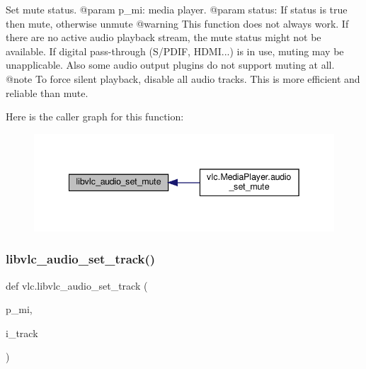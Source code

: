 \begin{DoxyVerb}Set mute status.
@param p_mi: media player.
@param status: If status is true then mute, otherwise unmute @warning This function does not always work. If there are no active audio playback stream, the mute status might not be available. If digital pass-through (S/PDIF, HDMI...) is in use, muting may be unapplicable. Also some audio output plugins do not support muting at all. @note To force silent playback, disable all audio tracks. This is more efficient and reliable than mute.
\end{DoxyVerb}
 Here is the caller graph for this function\+:
\nopagebreak
\begin{figure}[H]
\begin{center}
\leavevmode
\includegraphics[width=342pt]{namespacevlc_a76eac9d168adc4bab5d64c0e08e0333c_icgraph}
\end{center}
\end{figure}
\mbox{\label{namespacevlc_a98ac26f41a3d8271d1ec63d4a5c40289}} 
\subsubsection{\texorpdfstring{libvlc\+\_\+audio\+\_\+set\+\_\+track()}{libvlc\_audio\_set\_track()}}
{\footnotesize\ttfamily def vlc.\+libvlc\+\_\+audio\+\_\+set\+\_\+track (\begin{DoxyParamCaption}\item[{}]{p\+\_\+mi,  }\item[{}]{i\+\_\+track }\end{DoxyParamCaption})}

